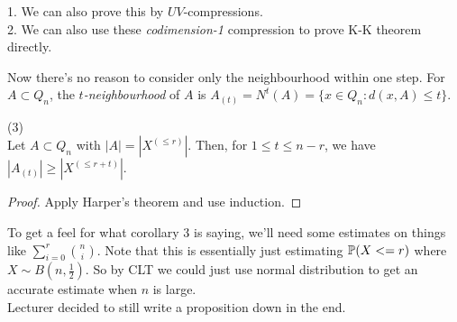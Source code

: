 \documentclass[a4paper]{article}
\begin{document}
\begin{rem}
    1. We can also prove this by $UV$-compressions.\\
    2. We can also use these \emph{codimension-1} compression to prove K-K theorem directly.
\end{rem}

Now there's no reason to consider only the neighbourhood within one step. For $A \subset Q_n$, the \emph{$t$-neighbourhood} of $A$ is $A_{(t)} = N^t (A) = \{x \in Q_n: d(x,A) \leq t\}$.

\begin{coro} (3)\\
    Let $A \subset Q_n$ with $|A| = |X^{(\leq r)}|$. Then, for $1 \leq t \leq n-r$, we have $|A_{(t)}| \geq |X^{(\leq r+t)}|$.
    \begin{proof}
        Apply Harper's theorem and use induction.
    \end{proof}
\end{coro}

To get a feel for what corollary 3 is saying, we'll need some estimates on things like $\sum_{i=0}^r {n\choose i}$. Note that this is essentially just estimating $\P(X<=r)$ where $X \sim B(n,\frac{1}{2})$. So by CLT we could just use normal distribution to get an accurate estimate when $n$ is large.\\
Lecturer decided to still write a proposition down in the end.
\end{document}
